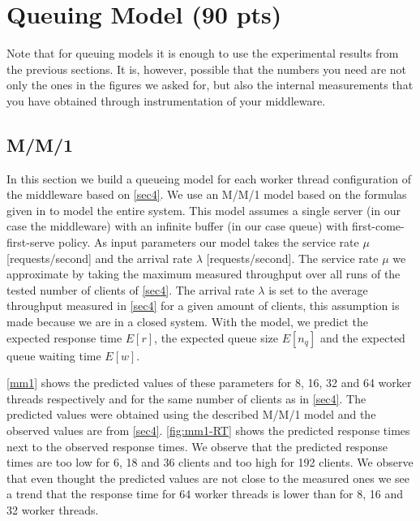 \documentclass[11pt,a4paper]{article}
\begin{document}
\section{Queuing Model (90 pts)}

Note that for queuing models it is enough to use the experimental results from the previous sections. It is, however, possible that the numbers you need are not only the ones in the figures we asked for, but also the internal measurements that you have obtained through instrumentation of your middleware.

\subsection{M/M/1} \label{sec7.1}
In this section we build a queueing model for each worker thread configuration of the middleware based on \autoref{sec4}. We use an M/M/1 model based on the formulas given in \cite{book1} to model the entire system. This model assumes a single server (in our case the middleware) with an infinite buffer (in our case queue) with first-come-first-serve policy. As input parameters our model takes the service rate $\mu$ [requests/second] and the arrival rate $\lambda$ [requests/second]. The service rate $\mu$ we approximate by taking the maximum measured throughput over all runs of the tested number of clients of \autoref{sec4}. The arrival rate $\lambda$ is set to the average throughput measured in \autoref{sec4} for a given amount of clients, this assumption is made because we are in a closed system.
With the model, we predict the expected response time $E[r]$, the expected queue size $E[n_q]$ and the expected queue waiting time $E[w]$.

\autoref{mm1} shows the predicted values of these parameters for 8, 16, 32 and 64 worker threads respectively and for the same number of clients as in \autoref{sec4}. The predicted values were obtained using the described M/M/1 model and the observed values are from \autoref{sec4}.
\autoref{fig:mm1-RT} shows the predicted response times next to the observed response times. We observe that the predicted response times are too low for 6, 18 and 36 clients and too high for 192 clients. We observe that even thought the predicted values are not close to the measured ones we see a trend that the response time for 64 worker threads is lower than for 8, 16 and 32 worker threads.
\end{document}

